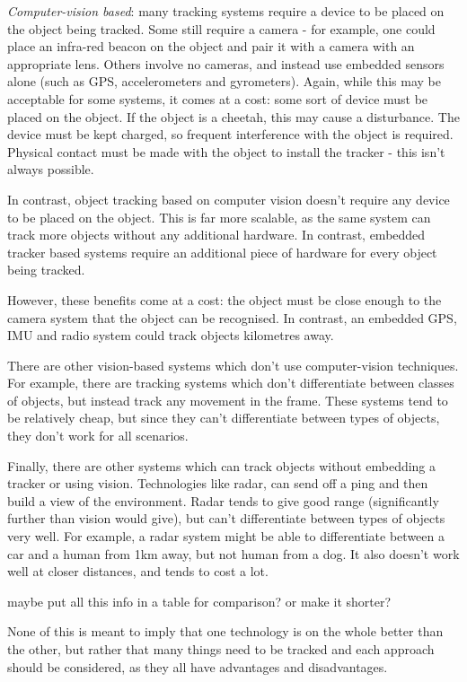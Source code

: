 \textit{Computer-vision based}: many tracking systems require a device to be placed on the object being tracked. Some still require a camera - for example, one could place an infra-red beacon on the object and pair it with a camera with an appropriate lens. Others involve no cameras, and instead use embedded sensors alone (such as GPS, accelerometers and gyrometers). Again, while this may be acceptable for some systems, it comes at a cost: some sort of device must be placed on the object. If the object is a cheetah, this may cause a disturbance. The device must be kept charged, so frequent interference with the object is required. Physical contact must be made with the object to install the tracker - this isn't always possible.

In contrast, object tracking based on computer vision doesn't require any device to be placed on the object. This is far more scalable, as the same system can track more objects without any additional hardware. In contrast, embedded tracker based systems require an additional piece of hardware for every object being tracked.

However, these benefits come at a cost: the object must be close enough to the camera system that the object can be recognised. In contrast, an embedded GPS, IMU and radio system could track objects kilometres away.

There are other vision-based systems which don't use computer-vision techniques. For example, there are tracking systems which don't differentiate between classes of objects, but instead track any movement in the frame. These systems tend to be relatively cheap, but since they can't differentiate between types of objects, they don't work for all scenarios.

Finally, there are other systems which can track objects without embedding a tracker or using vision. Technologies like radar, can send off a ping and then build a view of the environment. Radar tends to give good range (significantly further than vision would give), but can't differentiate between types of objects very well. For example, a radar system might be able to differentiate between a car and a human from 1km away, but not human from a dog. It also doesn't work well at closer distances, and tends to cost a lot.

{\Large \color{red} maybe put all this info in a table for comparison? or make it shorter?}

None of this is meant to imply that one technology is on the whole better than the other, but rather that many things need to be tracked and each approach should be considered, as they all have advantages and disadvantages.



